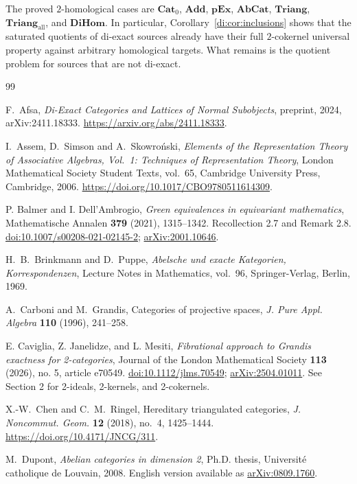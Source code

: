 \documentclass[11pt,reqno,a4paper]{amsart}
\theoremstyle{definition}
\theoremstyle{remark}
\newcommand{\0}{\mathbf{0}}
\renewcommand{\1}{\mathbf{1}}
\newcommand{\Triang}{\mathbf{Triang}}
\newcommand{\AbCat}{\mathbf{AbCat}}
\newcommand{\pExact}{\mathbf{pEx}}
\newcommand{\Pt}{\mathbf{Cat}_{0}}
\newcommand{\Add}{\mathbf{Add}}
\newcommand{\TriAll}{\mathbf{Triang}_{\mathrm{all}}}
\newcommand{\DiHom}{\mathbf{DiHom}}
\begin{document}
The proved $2$-homological cases are $\Pt$, $\Add$, $\pExact$,
$\AbCat$, $\Triang$, $\TriAll$, and $\DiHom$. In particular,
Corollary~\ref{di:cor:inclusions} shows that the saturated quotients
of di-exact sources already have their full $2$-cokernel universal
property against arbitrary homological targets. What remains is the
quotient problem for sources that are not di-exact.

\begin{thebibliography}{99}

F.~Afsa,
\emph{Di-Exact Categories and Lattices of Normal Subobjects},
preprint, 2024, arXiv:2411.18333.
\url{https://arxiv.org/abs/2411.18333}.

I.~Assem, D.~Simson and A.~Skowro\'nski,
\emph{Elements of the Representation Theory of Associative Algebras,
Vol.~1: Techniques of Representation Theory},
London Mathematical Society Student Texts, vol.~65,
Cambridge University Press, Cambridge, 2006.
\url{https://doi.org/10.1017/CBO9780511614309}.

P. Balmer and I. Dell'Ambrogio,
\emph{Green equivalences in equivariant mathematics},
Mathematische Annalen \textbf{379} (2021), 1315--1342.
Recollection 2.7 and Remark 2.8.
\href{https://doi.org/10.1007/s00208-021-02145-2}{doi:10.1007/s00208-021-02145-2};
\href{https://arxiv.org/abs/2001.10646}{arXiv:2001.10646}.

H.~B.~Brinkmann and D.~Puppe,
\emph{Abelsche und exacte Kategorien, Korrespondenzen},
Lecture Notes in Mathematics, vol.~96, Springer-Verlag, Berlin, 1969.

A.~Carboni and M.~Grandis,
Categories of projective spaces,
\emph{J. Pure Appl. Algebra} \textbf{110} (1996), 241--258.

E. Caviglia, Z. Janelidze, and L. Mesiti,
\emph{Fibrational approach to Grandis exactness for 2-categories},
Journal of the London Mathematical Society \textbf{113} (2026),
no. 5, article e70549.
\href{https://doi.org/10.1112/jlms.70549}{doi:10.1112/jlms.70549};
\href{https://arxiv.org/abs/2504.01011}{arXiv:2504.01011}.
See Section 2 for 2-ideals, 2-kernels, and 2-cokernels.

X.-W.~Chen and C.~M.~Ringel,
Hereditary triangulated categories,
\emph{J. Noncommut. Geom.} \textbf{12} (2018), no.~4, 1425--1444.
\url{https://doi.org/10.4171/JNCG/311}.

M.~Dupont,
\emph{Abelian categories in dimension 2},
Ph.D. thesis, Universit\'e catholique de Louvain, 2008.
English version available as
\href{https://arxiv.org/abs/0809.1760}{arXiv:0809.1760}.


\end{thebibliography}
\end{document}
